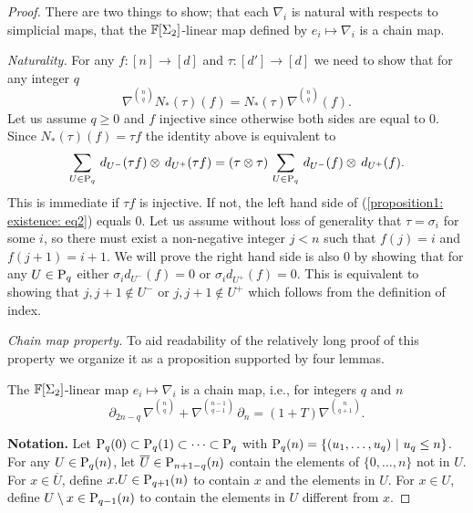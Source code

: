 \begin{proof}
	There are two things to show; that each $\nabla_i$ is natural with respects to simplicial maps, that the $\F[\Sigma_2]$-linear map	defined by $e_i \mapsto \nabla_i$ is a chain map.
	
	\textit{Naturality.} For any $f: [n] \to [d]$ and $\tau : [d'] \to [d]$ we need to show that for any integer $q$
	\begin{equation} \label{proposition1: existence: eq1}
	\nabla^{n \choose q} N_*(\tau)(f) = N_*(\tau)  \nabla^{n \choose q} (f).
	\end{equation}
	Let us assume $q \geq 0$ and $f$ injective since otherwise both sides are equal to 0. Since $N_*(\tau)(f) = \tau f$ the identity above is equivalent to
	\begin{equation} \label{proposition1: existence: eq2}
	\sum_{U \in \P_{q}}\, d_{U^-}(\tau f) \tensor \, d_{U^+}(\tau f) =
	(\tau \tensor \tau) \, \sum_{U \in \P_{q}}\, d_{U^-}(f) \tensor \, d_{U^+}(f) .
	\end{equation}
	This is immediate if $\tau f$ is injective. If not, the left hand side of (\ref{proposition1: existence: eq2}) equals $0$. Let us assume without loss of generality that $\tau = \sigma_i$ for some $i$, so there must exist a non-negative integer $j < n$ such that $f(j) = i$ and $f(j+1) = i+1$. We will prove the right hand side is also $0$ by showing that for any $U \in \P_q$ either $\sigma_i d_{U^-}(f) = 0$ or $\sigma_i d_{U^+}(f) = 0$. This is equivalent to showing that $j, j+1 \not \in U^-$ or $j, j+1 \not \in U^+$ which follows from the definition of index.
	
	\textit{Chain map property.} To aid readability of the relatively long proof of this property we organize it as a proposition supported by four lemmas.
	
	\begin{proposition} \label{proposition: chain map}
		The $\F[\Sigma_2]$-linear map $e_i \mapsto \nabla_i$ is a chain map, i.e., for integers $q$ and $n$
		\begin{equation} \label{proposition2: existence: eq1}
		\partial_{2n-q}\,\nabla^{n \choose q} + \nabla^{n-1 \choose q-1}\,\partial_n = (1+T)\nabla^{n \choose q+1}.
		\end{equation}
	\end{proposition}
	
	\textbf{Notation.} Let $\P_q(0) \subset \P_q(1) \subset \cdots \subset \P_q $ with \mbox{$\P_q(n) = \{(u_1, \dots, u_q)\ |\ u_q \leq n\}$}. For any $U \in \P_q(n)$, let $\overline{U} \in \P_{n+1-q}(n)$ contain the elements of $\{0, \dots, n\}$ not in $U$. For $x \in \overline{U}$, define $x.U \in \P_{q+1}(n)$ to contain $x$ and the elements in $U$. For $x \in U$, define $U \setminus x \in \P_{q-1}(n)$ to contain the elements in $U$ different from $x$. 
	

\end{proof}
